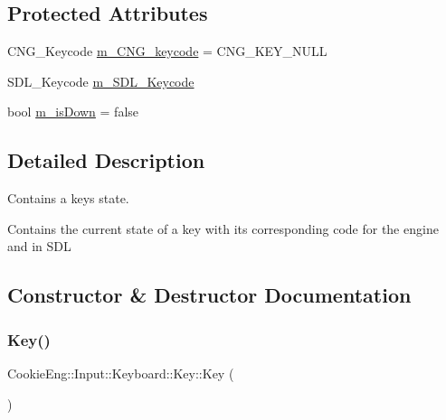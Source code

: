 \subsection*{Protected Attributes}
\begin{DoxyCompactItemize}
\item 
C\+N\+G\+\_\+\+Keycode \hyperlink{class_cookie_eng_1_1_input_1_1_keyboard_1_1_key_a3db742c409fa61f02d4dfac63b6cf8fe}{m\+\_\+\+C\+N\+G\+\_\+keycode} = C\+N\+G\+\_\+\+K\+E\+Y\+\_\+\+N\+U\+LL
\item 
S\+D\+L\+\_\+\+Keycode \hyperlink{class_cookie_eng_1_1_input_1_1_keyboard_1_1_key_afe0710d351e77160764ca176a13ead32}{m\+\_\+\+S\+D\+L\+\_\+\+Keycode}
\item 
bool \hyperlink{class_cookie_eng_1_1_input_1_1_keyboard_1_1_key_a85482b8698044d597eb4e09adbcd2d31}{m\+\_\+is\+Down} = false
\end{DoxyCompactItemize}


\subsection{Detailed Description}
Contains a key\textquotesingle{}s state. 

Contains the current state of a key with its corresponding code for the engine and in S\+DL 

\subsection{Constructor \& Destructor Documentation}
\mbox{\label{class_cookie_eng_1_1_input_1_1_keyboard_1_1_key_a263217e998b290d7e740ded3a76e06de}} 
\subsubsection{\texorpdfstring{Key()}{Key()}\hspace{0.1cm}{\footnotesize\ttfamily [1/2]}}
{\footnotesize\ttfamily Cookie\+Eng\+::\+Input\+::\+Keyboard\+::\+Key\+::\+Key (\begin{DoxyParamCaption}{ }\end{DoxyParamCaption})\hspace{0.3cm}{\ttfamily [inline]}}



